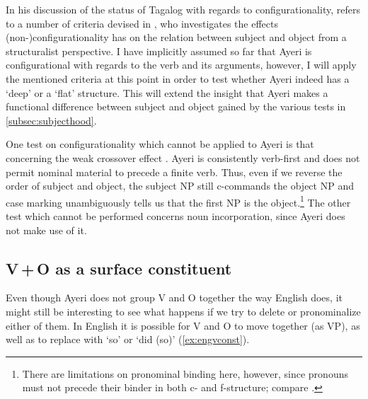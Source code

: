 In his discussion of the status of Tagalog with regards to configurationality,
\citet{kroeger1991} refers to a number of criteria devised in
\citet{speas1990}, who investigates the effects (non-)configurationality has on
the relation between subject and object from a structuralist perspective. I
have implicitly assumed so far that Ayeri is configurational with regards to
the verb and its arguments, however, I will apply the mentioned criteria at
this point in order to test whether Ayeri indeed has a `deep' or a `flat'
structure. This will extend the insight that Ayeri makes a functional
difference between subject and object gained by the various tests in
\autoref{subsec:subjecthood}.

One test on configurationality which cannot be applied to Ayeri is that
concerning the weak crossover effect \citep[133--135]{speas1990}. Ayeri is
consistently verb-first and does not permit nominal material to precede a
finite verb. Thus, even if we reverse the order of subject and object, the
subject NP still c-commands the object NP and case marking unambiguously tells
us that the first NP is the object.\footnote{There are limitations on
pronominal binding here, however, since pronouns must not precede their binder
in both c- and f-structure; compare \citet[213]{bresnan2016}.} The other test
which cannot be performed concerns noun incorporation, since Ayeri does not
make use of it.

\subsection{V\,+\,O as a surface constituent}

Even though Ayeri does not group V and O together the way English does, it
might still be interesting to see what happens if we try to delete or
pronominalize either of them. In English it is possible for V and O to move
together (as VP), as well as to replace  with `so' or `did (so)'
(\ref{ex:engvconst}).

